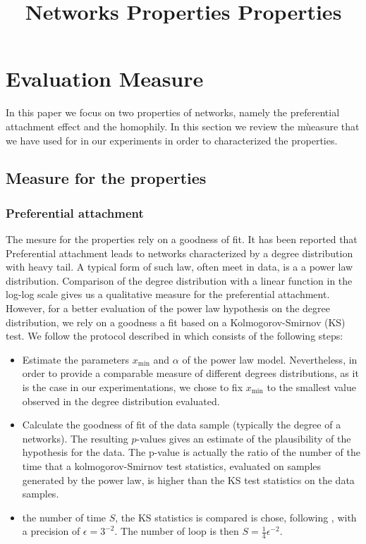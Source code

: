 \documentclass[a4paper, 12pt]{article}
\title{Networks Properties Properties}
\begin{document}
\maketitle
\tableofcontents

\section{Evaluation Measure}
In this paper we focus on two properties of networks, namely the preferential attachment effect and the homophily. In this section we review the mùeasure that we have used for in our experiments in order to characterized the properties.

\subsection{Measure for the properties}

\subsubsection{Preferential attachment}
\label{sec:experiments-burst}

The mesure for the properties rely on a goodness of fit. It has been reported that Preferential attachment leads to networks characterized by a degree distribution with heavy tail. A typical form of such law, often meet in data, is a a power law distribution. Comparison of the degree distribution with a linear function in the log-log scale  gives us a qualitative measure for the preferential attachment. However, for a better evaluation of the power law hypothesis on the degree distribution, we rely on a  goodness a fit based on a Kolmogorov-Smirnov (KS) test. We follow the protocol described in \cite{clauset2009power} which consists of the following steps:
\begin{itemize}
	\item Estimate the parameters $x_\text{min}$ and $\alpha$ of the power law model. Nevertheless, in order to provide a comparable measure of different degrees distributions, as it is the case in our experimentations, we chose to fix $x_\text{min}$  to the smallest value observed in the degree distribution evaluated.
	\item Calculate the goodness of fit of the data sample (typically the degree of a networks). The resulting $p$-values gives an estimate of the  plausibility of the hypothesis for the data. The p-value is actually the ratio of the number of the time that a kolmogorov-Smirnov test statistics, evaluated on samples generated by the power law, is higher than the KS test statistics on the data samples. 
    \item the number of time $S$, the KS statistics is compared is chose, following \cite{clauset2009power}, with a precision of $\epsilon = 3^{-2}$. The  number of loop is then $S = \frac{1}{4}\epsilon^{-2}$.
\end{itemize}
\end{document}

